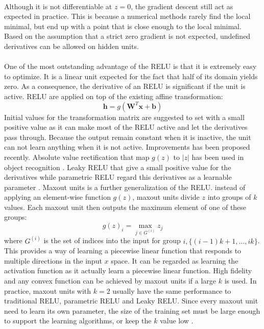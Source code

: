 \paragraph{}
Although it is not differentiable at $z=0$, the gradient descent still act as expected in practice.
This is because a numerical methods rarely find the local minimal, but end up with a point that is close enough to the local minimal.
Based on the assumption that a strict zero gradient is not expected, undefined derivatives can be allowed on hidden units.

\paragraph{}
One of the most outstanding advantage of the RELU is that it is extremely easy to optimize.
It is a linear unit expected for the fact that half of its domain yields zero.
As a consequence, the derivative of an RELU is significant if the unit is active.
RELU are applied on top of the existing affine transformation:
\begin{equation}
    \mathbf{h} = g( \mathbf{W}^T \mathbf{x} + \mathbf{b})
\end{equation}
Initial values for the transformation matrix are suggested to set with a small positive value as it can make most of the RELU active and let the derivatives pass through.
Because the output remain constant when it is inactive, the unit can not learn anything when it is not active.
Improvements has been proposed recently.
Absolute value rectification that map $g(z)$ to $|z|$ has been used in object recognition \cite{jarret2009}.
Leaky RELU that give a small positive value for the derivatives \cite{maas2013} while parametric RELU regard this derivatives as a learnable parameter \cite{He2015}.
Maxout units \cite{Goodfellow2013} is a further generalization of the RELU.
instead of applying an element-wise function $g(z)$, maxout units divide $z$ into groups of $k$ values.
Each maxout unit then outputs the maximum element of one of these groups:
\begin{equation}
    g(z)_i = \max_{j\in G^{(i)}} z_j
\end{equation}
where $G^{(i)}$ is the set of indices into the input for group $i, \{(i-1)k+1, \dots, ik \}$.
This provides a way of learning a piecewise linear function that responds to multiple directions in the input $x$ space.
It can be regarded as learning the activation function as it actually learn a piecewise linear function.
High fidelity and any convex function can be achieved by maxout units if a large $k$ is used.
In practice, maxout units with $k=2$ usually have the same performance to traditional RELU, parametric RELU and Leaky RELU.
Since every maxout unit need to learn its own parameter, the size of the training set must be large enough to support the learning algorithms, or keep the $k$ value low \cite{Cai2013}.

